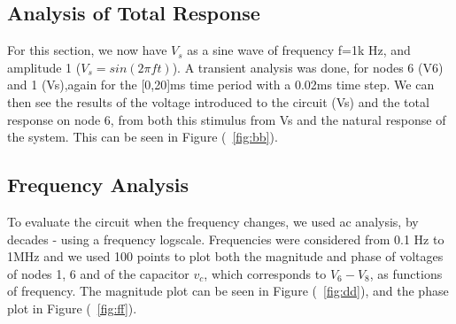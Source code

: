 \subsection{Analysis of Total Response}
For this section, we now have $V_s$ as a sine wave of frequency f=1k Hz, and amplitude 1 ($V_s=sin(2\pi f t)$). A transient analysis was done, for nodes 6 (V6) and 1 (Vs),again for the [0,20]ms time period with a 0.02ms time step. We can then see the results of the voltage introduced to the circuit (Vs) and the total response on node 6, from both this stimulus from Vs and the natural response of the system. This can be seen in Figure (~\ref{fig:bb}).\\
\subsection{Frequency Analysis}
To evaluate the circuit when the frequency changes, we used ac analysis, by decades - using a frequency logscale. Frequencies were considered from 0.1 Hz to 1MHz and we used 100 points to plot both the magnitude and phase of voltages of nodes 1, 6 and of the capacitor $v_c$, which corresponds to $V_6 - V_8$, as functions of frequency. The magnitude plot can be seen in Figure (~\ref{fig:dd}), and the phase plot in Figure (~\ref{fig:ff}).\\

